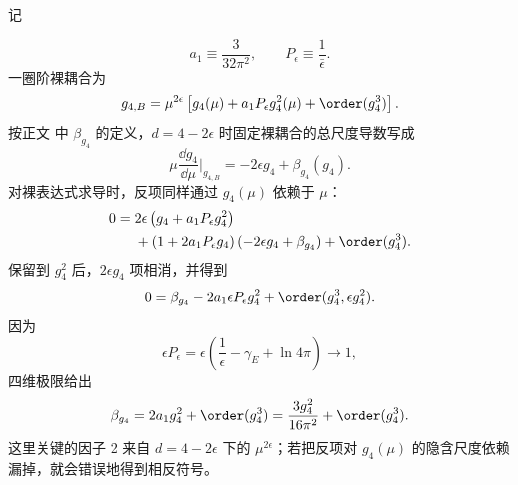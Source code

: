 \begin{derivation}[标量四次耦合的一圈演化]
记

\begin{equation*}
 a_1\equiv\frac{3}{32\pi^2},
 \qquad
 P_\epsilon\equiv\frac1{\bar\epsilon}.
\end{equation*}
一圈阶裸耦合为
\begin{equation*}
 g_{4,B}
 =\mu^{2\epsilon}
 \left[g_4(\mu)+a_1P_\epsilon g_4^2(\mu)
 +\order(g_4^3)\right].
\end{equation*}
按正文 中 $\beta_{g_4}$ 的定义，$d=4-2\epsilon$ 时固定裸耦合的总尺度导数写成
\begin{equation*}
 \mu\frac{\dd g_4}{\dd\mu}\Big|_{g_{4,B}}
 =-2\epsilon g_4+\beta_{g_4}(g_4).
\end{equation*}
对裸表达式求导时，反项同样通过 \(g_4(\mu)\) 依赖于 \(\mu\)：
\begin{align*}
 0={}&2\epsilon
 \left(g_4+a_1P_\epsilon g_4^2\right)\\
 &+\left(1+2a_1P_\epsilon g_4\right)
 \left(-2\epsilon g_4+\beta_{g_4}\right)
 +\order(g_4^3).
\end{align*}
保留到 \(g_4^2\) 后，\(2\epsilon g_4\) 项相消，并得到
\begin{equation*}
 0=\beta_{g_4}
 -2a_1\epsilon P_\epsilon g_4^2
 +\order(g_4^3,\epsilon g_4^2).
\end{equation*}
因为
\begin{equation*}
 \epsilon P_\epsilon
 =\epsilon\left(\frac1\epsilon-\gamma_E+\ln4\pi\right)
 \longrightarrow1,
\end{equation*}
四维极限给出
\begin{equation*}
 \beta_{g_4}=2a_1g_4^2+
\order(g_4^3)
 =\frac{3g_4^2}{16\pi^2}+
\order(g_4^3).
\end{equation*}
这里关键的因子 2 来自 \(d=4-2\epsilon\) 下的 \(\mu^{2\epsilon}\)；若把反项对 \(g_4(\mu)\) 的隐含尺度依赖漏掉，就会错误地得到相反符号。
\end{derivation}

